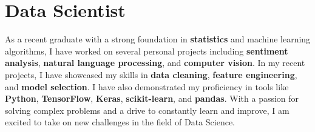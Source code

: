 
\section{Data Scientist}
\small{
    As a recent graduate with a strong foundation in \textbf{statistics} and machine learning algorithms, I have worked on several personal projects including \textbf{sentiment analysis}, \textbf{natural language processing}, and \textbf{computer vision}. In my recent projects, I have showcased my skills in \textbf{data cleaning}, \textbf{feature engineering}, and \textbf{model selection}. I have also demonstrated my proficiency in tools like \textbf{Python}, \textbf{TensorFlow}, \textbf{Keras}, \textbf{scikit-learn}, and \textbf{pandas}. With a passion for solving complex problems and a drive to constantly learn and improve, I am excited to take on new challenges in the field of Data Science.
}